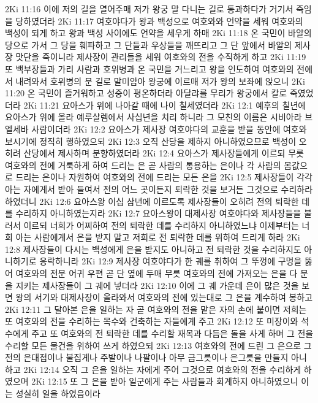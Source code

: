 2Ki 11:16  이에 저의 길을 열어주매 저가 왕궁 말 다니는 길로 통과하다가 거기서 죽임을 당하였더라
2Ki 11:17  여호야다가 왕과 백성으로 여호와와 언약을 세워 여호와의 백성이 되게 하고 왕과 백성 사이에도 언약을 세우게 하매
2Ki 11:18  온 국민이 바알의 당으로 가서 그 당을 훼파하고 그 단들과 우상들을 깨뜨리고 그 단 앞에서 바알의 제사장 맛단을 죽이니라 제사장이 관리들을 세워 여호와의 전을 수직하게 하고
2Ki 11:19  또 백부장들과 가리 사람과 호위병과 온 국민을 거느리고 왕을 인도하여 여호와의 전에서 내려와서 호위병의 문 길로 말미암아 왕궁에 이르매 저가 왕의 보좌에 앉으니
2Ki 11:20  온 국민이 즐거워하고 성중이 평온하더라 아달랴를 무리가 왕궁에서 칼로 죽였었더라
2Ki 11:21  요아스가 위에 나아갈 때에 나이 칠세였더라
2Ki 12:1  예후의 칠년에 요아스가 위에 올라 예루살렘에서 사십년을 치리 하니라 그 모친의 이름은 시비아라 브엘세바 사람이더라
2Ki 12:2  요아스가 제사장 여호야다의 교훈을 받을 동안에 여호와 보시기에 정직히 행하였으되
2Ki 12:3  오직 산당을 제하지 아니하였으므로 백성이 오히려 산당에서 제사하며 분향하였더라
2Ki 12:4  요아스가 제사장들에게 이르되 무릇 여호와의 전에 거룩하게 하여 드리는 은 곧 사람의 통용하는 은이나 각 사람의 몸값으로 드리는 은이나 자원하여 여호와의 전에 드리는 모든 은을
2Ki 12:5  제사장들이 각각 아는 자에게서 받아 들여서 전의 어느 곳이든지 퇴락한 것을 보거든 그것으로 수리하라 하였더니
2Ki 12:6  요아스왕 이십 삼년에 이르도록 제사장들이 오히려 전의 퇴락한 데를 수리하지 아니하였는지라
2Ki 12:7  요아스왕이 대제사장 여호야다와 제사장들을 불러서 이르되 너희가 어찌하여 전의 퇴락한 데를 수리하지 아니하였느냐 이제부터는 너희 아는 사람에게서 은을 받지 말고 저희로 전 퇴락한 데를 위하여 드리게 하라
2Ki 12:8  제사장들이 다시는 백성에게 은을 받지도 아니하고 전 퇴락한 것을 수리하지도 아니하기로 응락하니라
2Ki 12:9  제사장 여호야다가 한 궤를 취하여 그 뚜껑에 구멍을 뚫어 여호와의 전문 어귀 우편 곧 단 옆에 두매 무릇 여호와의 전에 가져오는 은을 다 문을 지키는 제사장들이 그 궤에 넣더라
2Ki 12:10  이에 그 궤 가운데 은이 많은 것을 보면 왕의 서기와 대제사장이 올라와서 여호와의 전에 있는대로 그 은을 계수하여 봉하고
2Ki 12:11  그 달아본 은을 일하는 자 곧 여호와의 전을 맡은 자의 손에 붙이면 저희는 또 여호와의 전을 수리하는 목수와 건축하는 자들에게 주고
2Ki 12:12  또 미장이와 석수에게 주고 또 여호와의 전 퇴락한 데를 수리할 재목과 다듬은 돌을 사게 하며 그 전을 수리할 모든 물건을 위하여 쓰게 하였으되
2Ki 12:13  여호와의 전에 드린 그 은으로 그 전의 은대접이나 불집게나 주발이나 나팔이나 아무 금그릇이나 은그릇을 만들지 아니하고
2Ki 12:14  오직 그 은을 일하는 자에게 주어 그것으로 여호와의 전을 수리하게 하였으며
2Ki 12:15  또 그 은을 받아 일군에게 주는 사람들과 회계하지 아니하였으니 이는 성실히 일을 하였음이라
